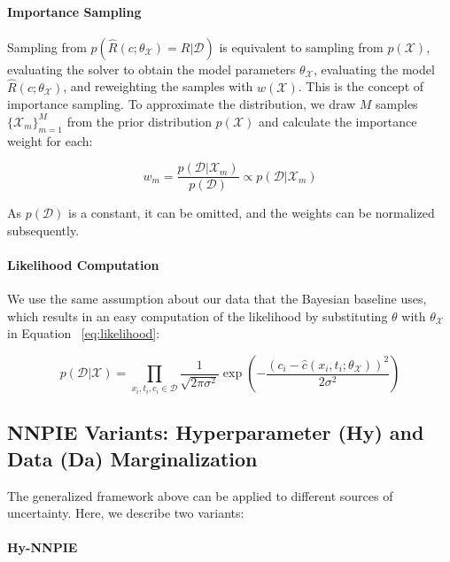 \paragraph{Importance Sampling}

Sampling from $p(\hat{R}(c; \theta_{\mathcal{X}}) = R| \mathcal{D})$ is equivalent to sampling from $p(\mathcal{X})$, evaluating the solver to obtain the model parameters $\theta_{\mathcal{X}}$, evaluating the model $\hat{R}(c; \theta_{\mathcal{X}})$, and reweighting the samples with $w(\mathcal{X})$. This is the concept of importance sampling. To approximate the distribution, we draw $M$ samples $\{\mathcal{X}_m\}_{m=1}^M$ from the prior distribution $p(\mathcal{X})$ and calculate the importance weight for each:

\begin{equation*}
w_m = \frac{p(\mathcal{D} | \mathcal{X}_m)}{p(\mathcal{D})} \propto p(\mathcal{D} | \mathcal{X}_m)
\end{equation*}

As $p(\mathcal{D})$ is a constant, it can be omitted, and the weights can be normalized subsequently.


\paragraph{Likelihood Computation}

We use the same assumption about our data that the Bayesian baseline uses, which results in an easy computation of the likelihood by substituting $\theta$ with $\theta_{\mathcal{X}}$ in Equation ~\vref{eq:likelihood}:

\begin{equation*}
p(\mathcal{D} | \mathcal{X}) = \prod_{x_i, t_i, c_i \in \mathcal{D}} \frac{1}{\sqrt{2\pi \sigma^2}} \exp \left( -\frac{(c_i - \hat{c}(x_i, t_i; \theta_{\mathcal{X}}))^2}{2\sigma^2} \right)
\end{equation*}

\subsection{NNPIE Variants: Hyperparameter (Hy) and Data (Da) Marginalization}

The generalized framework above can be applied to different sources of uncertainty. Here, we describe two variants:

\paragraph{Hy-NNPIE}

